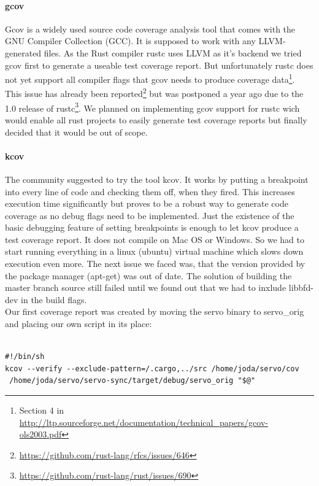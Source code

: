 \documentclass{scrartcl}
\begin{document}
\paragraph{gcov}
Gcov is a widely used source code coverage analysis tool that comes with the GNU Compiler Collection (GCC). It is supposed to work with any LLVM-generated files. As the Rust compiler rustc uses LLVM as it's backend we tried gcov first to generate a useable test coverage report. But unfortunately rustc does not yet support all compiler flags that gcov needs to produce coverage data\footnote{Section 4 in \url{http://ltp.sourceforge.net/documentation/technical_papers/gcov-ols2003.pdf}}. This issue has already been reported\footnote{\url{https://github.com/rust-lang/rfcs/issues/646}} but was postponed a year ago due to the 1.0 release of rustc\footnote{\url{https://github.com/rust-lang/rust/issues/690}}. We planned on implementing gcov support for rustc wich would enable all rust projects to easily generate test coverage reports but finally decided that it would be out of scope.

\paragraph{kcov}
The community suggested to try the tool kcov. It works by putting a breakpoint into every line of code and checking them off, when they fired. This increases execution time significantly but proves to be a robust way to generate code coverage as no debug flags need to be implemented. Just the existence of the basic debugging feature of setting breakpoints is enough to let kcov produce a test coverage report. It does not compile on Mac OS or Windows. So we had to start running everything in a linux (ubuntu) virtual machine which slows down execution even more. The next issue we faced was, that the version provided by the package manager (apt-get) was out of date. The solution of building the master branch source still failed until we found out that we had to inxlude libbfd-dev in the build flags.\\

Our first coverage report was created by moving the servo binary to servo\_orig and placing our own script in its place:

\begin{verbatim}

#!/bin/sh
kcov --verify --exclude-pattern=/.cargo,../src /home/joda/servo/cov 
 /home/joda/servo/servo-sync/target/debug/servo_orig "$@"

\end{verbatim}
\end{document}
